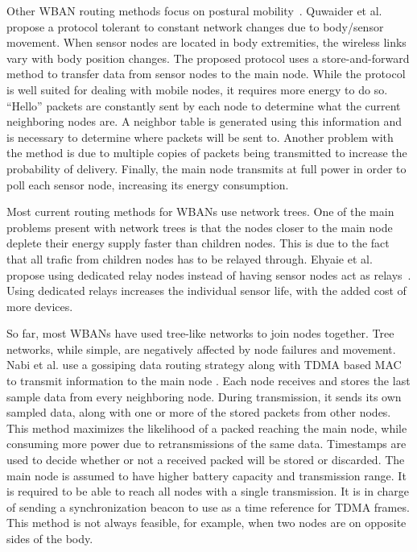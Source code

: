 Other WBAN routing methods focus on postural mobility~\cite{routing:storeandforward}. Quwaider et al. propose a protocol tolerant to constant network changes due to body/sensor movement. When sensor nodes are located in body extremities, the wireless links vary with body position changes. The proposed protocol uses a store-and-forward method to transfer data from sensor nodes to the main node. While the protocol is well suited for dealing with mobile nodes, it requires more energy to do so. ``Hello'' packets are constantly sent by each node to determine what the current neighboring nodes are. A neighbor table is generated using this information and is necessary to determine where packets will be sent to. Another problem with the method is due to multiple copies of packets being transmitted to increase the probability of delivery. Finally, the main node transmits at full power in order to poll each sensor node, increasing its energy consumption.

Most current routing methods for WBANs use network trees. One of the main problems present with network trees is that the nodes closer to the main node deplete their energy supply faster than children nodes. This is due to the fact that all trafic from children nodes has to be relayed through. Ehyaie et al. propose using dedicated relay nodes instead of having sensor nodes act as relays~\cite{relay:networklife}. Using dedicated relays increases the individual sensor life, with the added cost of more devices.

So far, most WBANs have used tree-like networks to join nodes together. Tree networks, while simple, are negatively affected by node failures and movement.  Nabi et al. use a gossiping data routing strategy along with TDMA based MAC to transmit information to the main node \cite{relay:transmitpoweradaptation}. Each node receives and stores the last sample data from every neighboring node. During transmission, it sends its own sampled data, along with one or more of the stored packets from other nodes. This method maximizes the likelihood of a packed reaching the main node, while consuming more power due to retransmissions of the same data. Timestamps are used to decide whether or not a received packed will be stored or discarded. The main node is assumed to have higher battery capacity and transmission range. It is required to be able to reach all nodes with a single transmission. It is in charge of sending a synchronization beacon to use as a time reference for TDMA frames. This method is not always feasible, for example, when two nodes are on opposite sides of the body.

